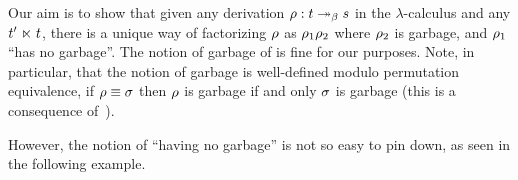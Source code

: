 \bigskip

Our aim is to show that
given any derivation $\rho : t \mathrel{\twoheadrightarrow_\beta} s$ in the $\lambda$-calculus
and any $t' \mathrel{\ltimes} t$,
there is a unique way of factorizing $\rho$ as $\rho_1 \rho_2$
where $\rho_2$ is garbage, and $\rho_1$ ``has no garbage''.
The notion of garbage of  is fine for our purposes.
Note, in particular,
that the notion of garbage is well-defined modulo permutation equivalence,
\ie if $\rho \equiv \sigma$ then $\rho$ is garbage if and only $\sigma$ is garbage
(this is a consequence of~).

However, the notion of ``having no garbage'' is not so easy to pin down,
as seen in the following example.

